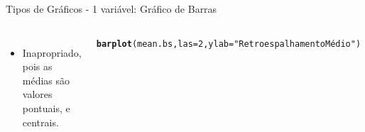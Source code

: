 \documentclass{beamer}\usepackage[]{graphicx}\usepackage[]{color}
\makeatletter
\newcommand{\hlnum}[1]{\textcolor[rgb]{0.686,0.059,0.569}{#1}}%
\newcommand{\hlstr}[1]{\textcolor[rgb]{0.192,0.494,0.8}{#1}}%
\newcommand{\hlstd}[1]{\textcolor[rgb]{0.345,0.345,0.345}{#1}}%
\newcommand{\hlkwc}[1]{\textcolor[rgb]{0.333,0.667,0.333}{#1}}%
\newcommand{\hlkwd}[1]{\textcolor[rgb]{0.737,0.353,0.396}{\textbf{#1}}}%
\newenvironment{kframe}{%
 \def\at@end@of@kframe{}%
 \ifinner\ifhmode%
  \def\at@end@of@kframe{\end{minipage}}%
  \begin{minipage}{\columnwidth}%
 \fi\fi%
 \def\FrameCommand##1{\hskip\@totalleftmargin \hskip-\fboxsep
 \colorbox{shadecolor}{##1}\hskip-\fboxsep
     \hskip-\linewidth \hskip-\@totalleftmargin \hskip\columnwidth}%
 \MakeFramed {\advance\hsize-\width
   \@totalleftmargin\z@ \linewidth\hsize
   \@setminipage}}%
 {\par\unskip\endMakeFramed%
 \at@end@of@kframe}
\newenvironment{knitrout}{}{} %
\renewenvironment{knitrout}{\setlength{\topsep}{0mm}}{}
\makeatother
\begin{document}
\begin{frame}[fragile]{Tipos de Gráficos - 1 variável: Gráfico de Barras} 

\begin{columns}[t]

\begin{itemize}

\item \scriptsize{Inapropriado, pois as médias são valores pontuais, e centrais.}
\end{itemize}

\begin{knitrout}\tiny
{}\color{fgcolor}\begin{kframe}
\begin{alltt}
\hlkwd{barplot}\hlstd{(mean.bs,}\hlkwc{las}\hlstd{=}\hlnum{2}\hlstd{,}\hlkwc{ylab}\hlstd{=}\hlstr{"Retroespalhamento Médio"}\hlstd{)}
\end{alltt}
\end{kframe}
\end{knitrout}


\begin{knitrout}
\color{fgcolor}
\includegraphics[width=1\linewidth]{figure/unnamed-chunk-53-1} 

\end{knitrout}

\end{columns}

\end{frame}
\end{document}
